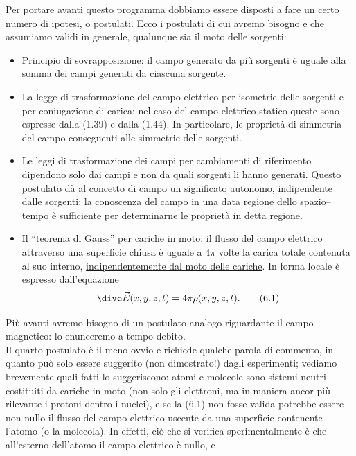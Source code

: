 Per portare avanti questo programma dobbiamo essere disposti a fare un certo
numero di ipotesi, o postulati. Ecco i postulati di cui avremo bisogno e che
assumiamo validi in generale, qualunque sia il moto delle sorgenti:
\begin{itemize}
  \item[$\mathbf p_1$] Principio di sovrapposizione: il campo generato da pi\`u
    sorgenti \`e uguale alla somma dei campi generati da ciascuna sorgente.
  \item[$\mathbf p_2$] La legge di trasformazione del campo elettrico per
    isometrie delle sorgenti e per coniugazione di carica; nel caso del campo
    elettrico statico queste sono espresse dalla (1.39) e dalla (1.44). In
    particolare, le propriet\`a di simmetria del campo conseguenti alle
    simmetrie delle sorgenti.
  \item[$\mathbf p_3$] Le leggi di trasformazione dei campi per cambiamenti di
    riferimento dipendono solo dai campi e non da quali sorgenti li hanno
    generati. Questo postulato d\`a al concetto di campo un significato
    autonomo, indipendente dalle sorgenti: la conoscenza del campo in una data
    regione dello spazio--tempo \`e sufficiente per determinarne le propriet\`a
    in detta regione.
  \item[$\mathbf p_4$] Il ``teorema di Gauss'' per cariche in moto: il flusso
    del campo elettrico attraverso una superficie chiusa \`e uguale a $4\pi$
    volte la carica totale contenuta al suo interno,
    \underline{indipendentemente dal moto delle cariche}. In forma locale \`e
    espresso dall'equazione
    \begin{equation}
      \dive\vec E(x,y,z,t)=4\pi\rho(x,y,z,t).
      \tag{6.1}
    \end{equation}
\end{itemize}
Pi\`u avanti avremo bisogno di un postulato analogo riguardante il campo
magnetico: lo enunceremo a tempo debito.\\
Il quarto postulato \`e il meno ovvio e richiede qualche parola di commento, in
quanto pu\`o solo essere suggerito (non dimostrato!) dagli esperimenti; vediamo
brevemente quali fatti lo suggeriscono: atomi e molecole sono sistemi neutri
costituiti da cariche in moto (non solo gli elettroni, ma in maniera ancor pi\`u
rilevante i protoni dentro i nuclei), e se la (6.1) non fosse valida potrebbe
essere non nullo il flusso del campo elettrico uscente da una superficie
contenente l'atomo (o la molecola). In effetti, ci\`o che si verifica
sperimentalmente \`e che all'esterno dell'atomo il campo elettrico \`e nullo, e

